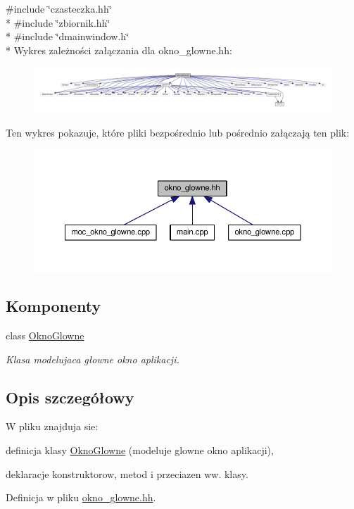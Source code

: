 {\ttfamily \#include \char`\"{}czasteczka.\-hh\char`\"{}}\\*
{\ttfamily \#include \char`\"{}zbiornik.\-hh\char`\"{}}\\*
{\ttfamily \#include \char`\"{}dmainwindow.\-h\char`\"{}}\\*
Wykres zależności załączania dla okno\-\_\-glowne.\-hh\-:
\nopagebreak
\begin{figure}[H]
\begin{center}
\leavevmode
\includegraphics[width=350pt]{okno__glowne_8hh__incl}
\end{center}
\end{figure}
Ten wykres pokazuje, które pliki bezpośrednio lub pośrednio załączają ten plik\-:
\nopagebreak
\begin{figure}[H]
\begin{center}
\leavevmode
\includegraphics[width=350pt]{okno__glowne_8hh__dep__incl}
\end{center}
\end{figure}
\subsection*{Komponenty}
\begin{DoxyCompactItemize}
\item 
class \hyperlink{class_okno_glowne}{Okno\-Glowne}
\begin{DoxyCompactList}\small\item\em Klasa modelujaca głowne okno aplikacji. \end{DoxyCompactList}\end{DoxyCompactItemize}


\subsection{Opis szczegółowy}
W pliku znajduja sie\-:
\begin{DoxyItemize}
\item definicja klasy \hyperlink{class_okno_glowne}{Okno\-Glowne} (modeluje glowne okno aplikacji),
\item deklaracje konstruktorow, metod i przeciazen ww. klasy. 
\end{DoxyItemize}

Definicja w pliku \hyperlink{okno__glowne_8hh_source}{okno\-\_\-glowne.\-hh}.

